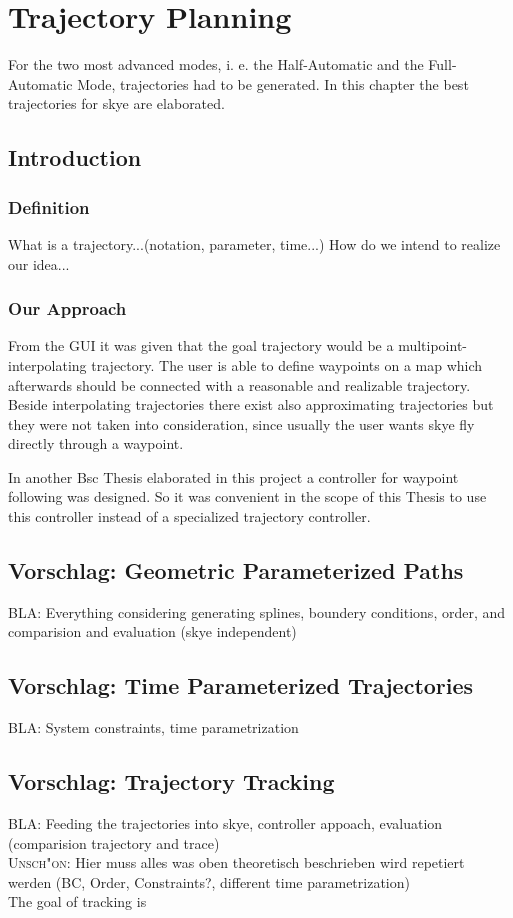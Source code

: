 \chapter{Trajectory Planning}
For the two most advanced modes, i. e. the Half-Automatic and the Full-Automatic Mode, trajectories had to be generated. In this chapter the best trajectories for skye are elaborated.

\section{Introduction}

\subsection{Definition}
What is a trajectory...(notation, parameter, time...)
How do we intend to realize our idea... 

\subsection{Our Approach}
From the GUI it was given that the goal trajectory would be a multipoint-interpolating trajectory. The user is able to define waypoints on a map which afterwards should be connected with a reasonable and realizable trajectory. Beside interpolating trajectories there exist also approximating trajectories but they were not taken into consideration, since usually the user wants skye fly directly through a waypoint.

In another Bsc Thesis elaborated in this project a controller for waypoint following was designed. So it was convenient in the scope of this Thesis to use this controller instead of a specialized trajectory controller.

\section{Vorschlag: Geometric Parameterized Paths}
BLA: Everything considering generating splines, boundery conditions, order, and comparision and evaluation (skye independent)
\section{Vorschlag: Time Parameterized Trajectories}
BLA: System constraints, time parametrization
\section{Vorschlag: Trajectory Tracking}
BLA: Feeding the trajectories into skye, controller appoach, evaluation (comparision trajectory and trace) \\
\textsc{Unsch"on:} Hier muss alles was oben theoretisch beschrieben wird repetiert werden (BC, Order, Constraints?, different time parametrization) \\
The goal of tracking is

